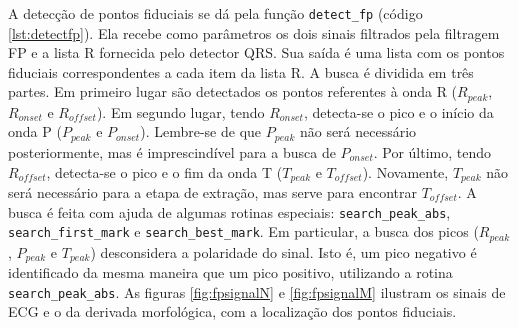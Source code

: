 A detecção de pontos fiduciais se dá pela função \texttt{detect\_fp} (código \ref{lst:detectfp}). Ela recebe como parâmetros os dois sinais filtrados pela filtragem FP e a lista R fornecida pelo detector QRS. Sua saída é uma lista com os pontos fiduciais correspondentes a cada item da lista R. A busca é dividida em três partes. Em primeiro lugar são detectados os pontos referentes à onda R ($R_{peak}$, $R_{onset}$ e $R_{offset}$). Em segundo lugar, tendo $R_{onset}$, detecta-se o pico e o início da onda P ($P_{peak}$ e $P_{onset}$). Lembre-se de que $P_{peak}$ não será necessário posteriormente, mas é imprescindível para a busca de $P_{onset}$. Por último, tendo $R_{offset}$, detecta-se o pico e o fim da onda T ($T_{peak}$ e $T_{offset}$). Novamente, $T_{peak}$ não será necessário para a etapa de extração, mas serve para encontrar $T_{offset}$. A busca é feita com ajuda de algumas rotinas especiais: \texttt{search\_peak\_abs}, \texttt{search\_first\_mark} e \texttt{search\_best\_mark}. Em particular, a busca dos picos ($R_{peak}$, $P_{peak}$ e $T_{peak}$) desconsidera a polaridade do sinal. Isto é, um pico negativo é identificado da mesma maneira que um pico positivo, utilizando a rotina \texttt{search\_peak\_abs}. As figuras \ref{fig:fpsignalN} e \ref{fig:fpsignalM} ilustram os sinais de ECG e o da derivada morfológica, com a localização dos pontos fiduciais.

